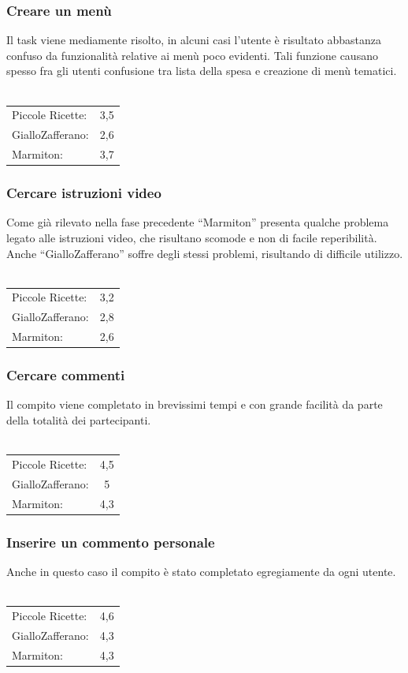 \subsubsection{Creare un menù}
Il task viene mediamente risolto, in alcuni casi l'utente è risultato abbastanza
confuso da funzionalità relative ai menù poco evidenti. Tali funzione causano spesso fra gli utenti confusione tra lista
della spesa e creazione di menù tematici.\\\\
\begin{tabular}{l c}
Piccole Ricette: & 3,5\\
GialloZafferano: & 2,6\\
Marmiton: & 3,7\\
\end{tabular}

\subsubsection{Cercare istruzioni video}
Come già rilevato nella fase precedente ``Marmiton'' presenta qualche problema legato
alle istruzioni video, che risultano scomode e non di facile reperibilità. Anche
``GialloZafferano'' soffre degli stessi problemi, risultando di difficile utilizzo.\\\\
\begin{tabular}{l c}
Piccole Ricette: & 3,2\\
GialloZafferano: & 2,8\\
Marmiton: & 2,6\\
\end{tabular}

\subsubsection{Cercare commenti}
Il compito viene completato in brevissimi tempi e con grande facilità da parte
della totalità dei partecipanti.\\\\
\begin{tabular}{l c}
Piccole Ricette: & 4,5\\
GialloZafferano: & 5\\
Marmiton: & 4,3\\
\end{tabular}

\subsubsection{Inserire un commento personale}
Anche in questo caso il compito è stato completato egregiamente da ogni
utente.\\\\
\begin{tabular}{l c}
Piccole Ricette: & 4,6\\
GialloZafferano: & 4,3\\
Marmiton: & 4,3\\
\end{tabular}

